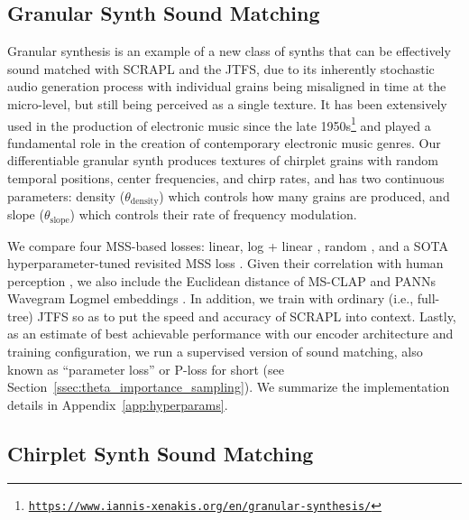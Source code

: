 \documentclass{article} %
\theoremstyle{plain}
\theoremstyle{definition}
\theoremstyle{remark}
\begin{document}
\subsection{Granular Synth Sound Matching}
\label{ssec:exp_granular}
\vspace{-5pt}

Granular synthesis is an example of a new class of synths that can be effectively sound matched with SCRAPL and the JTFS, due to its inherently stochastic audio generation process with individual grains being misaligned in time at the micro-level, but still being perceived as a single texture.
It has been extensively used in the production of electronic music since the late 1950s\footnote{\texttt{\url{https://www.iannis-xenakis.org/en/granular-synthesis/}}} and played a fundamental role in the creation of contemporary electronic music genres.
Our differentiable granular synth produces textures of chirplet grains with random temporal positions, center frequencies, and chirp rates, and has two continuous parameters: density ($\theta_{\mathrm{density}}$) which controls how many grains are produced, and slope ($\theta_{\mathrm{slope}}$) which controls their rate of frequency modulation.

We compare four MSS-based losses: linear, log + linear \citep{engel2020ddsp}, random \citep{steinmetz2020auraloss}, and a SOTA hyperparameter-tuned revisited MSS loss \citep{schwar2023multi}.
Given their correlation with human perception \citep{kilgour2019interspeech, tailleur2024correlation}, we also include the Euclidean distance of MS-CLAP \citep{elizalde2023clap} and PANNs Wavegram Logmel embeddings \citep{kong2020panns}.
In addition, we train with ordinary (i.e., full-tree) JTFS so as to put the speed and accuracy of SCRAPL into context.
Lastly, as an estimate of best achievable performance with our encoder architecture and training configuration, we run a supervised version of sound matching, also known as ``parameter loss'' or P-loss for short (see Section~\ref{ssec:theta_importance_sampling}).
We summarize the implementation details in Appendix~\ref{app:hyperparams}.


\subsection{Chirplet Synth Sound Matching}
\label{ssec:exp_chirplet}
\vspace{-5pt}
\end{document}
